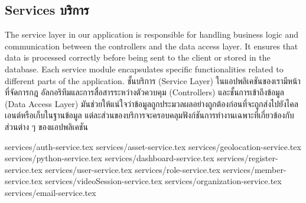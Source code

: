 \subsection{\ifenglish Services \else บริการ \fi}

\ifenglish
The service layer in our application is responsible for handling business logic and communication between the controllers and the data access layer. It ensures that data is processed correctly before being sent to the client or stored in the database. Each service module encapsulates specific functionalities related to different parts of the application.
\else
ชั้นบริการ (Service Layer) ในแอปพลิเคชันของเรามีหน้าที่จัดการกฎ อัลกอริทึมและการสื่อสารระหว่างตัวควบคุม (Controllers) และชั้นการเข้าถึงข้อมูล (Data Access Layer) มันช่วยให้แน่ใจว่าข้อมูลถูกประมวลผลอย่างถูกต้องก่อนที่จะถูกส่งไปยังไคลเอนต์หรือเก็บในฐานข้อมูล แต่ละส่วนของบริการจะครอบคลุมฟังก์ชันการทำงานเฉพาะที่เกี่ยวข้องกับส่วนต่าง ๆ ของแอปพลิเคชัน
\fi


{services/auth-service.tex}
{services/asset-service.tex}
{services/geolocation-service.tex}
{services/python-service.tex}
{services/dashboard-service.tex}
{services/register-service.tex}
{services/user-service.tex}
{services/role-service.tex}
{services/member-service.tex}
{services/videoSession-service.tex}
{services/organization-service.tex}
{services/email-service.tex}